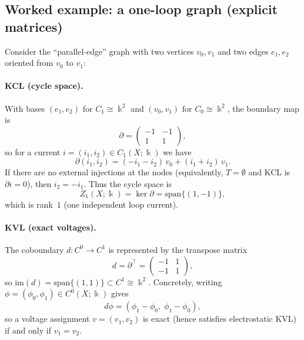 \documentclass[11pt]{article}
\begin{document}
\subsection{Worked example: a one-loop graph (explicit matrices)}
\label{sec:example-tree-loop}
Consider the ``parallel-edge'' graph with two vertices $v_0,v_1$ and two edges $e_1,e_2$ oriented from $v_0$ to $v_1$:
\begin{center}
\end{center}
\paragraph{KCL (cycle space).}
With bases $(e_1,e_2)$ for $C_1\cong \Bbbk^2$ and $(v_0,v_1)$ for $C_0\cong \Bbbk^2$, the boundary map is
\[
\partial=\begin{pmatrix}-1 & -1\\ 1 & 1\end{pmatrix},
\]
so for a current $i=(i_1,i_2)\in C_1(X;\Bbbk)$ we have
\[
\partial(i_1,i_2)=(-i_1-i_2)\,v_0+(i_1+i_2)\,v_1.
\]
If there are no external injections at the nodes (equivalently, $T=\emptyset$ and KCL is $\partial i=0$), then $i_2=-i_1$.
Thus the cycle space is
\[
Z_1(X;\Bbbk)=\ker\partial=\mathrm{span}\{(1,-1)\},
\]
which is rank~$1$ (one independent loop current).

\paragraph{KVL (exact voltages).}
The coboundary $d\colon C^0\to C^1$ is represented by the transpose matrix
\[
d=\partial^\top=\begin{pmatrix}-1 & 1\\ -1 & 1\end{pmatrix},
\]
so $\mathrm{im}(d)=\mathrm{span}\{(1,1)\}\subset C^1\cong \Bbbk^2$.
Concretely, writing $\phi=(\phi_0,\phi_1)\in C^0(X;\Bbbk)$ gives
\[
d\phi=(\phi_1-\phi_0,\;\phi_1-\phi_0),
\]
so a voltage assignment $v=(v_1,v_2)$ is exact (hence satisfies electrostatic KVL) if and only if $v_1=v_2$.
\end{document}
